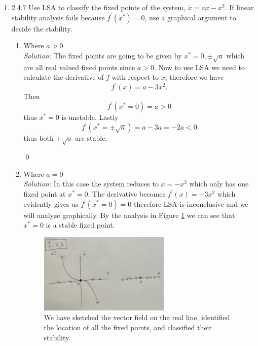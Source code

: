 \documentclass[10pt]{amsart}
\theoremstyle{nonumberplain}
\begin{document}
\begin{enumerate}[label={\bf {\arabic*}:}]
\begin{enumerate}
\end{enumerate}

\newpage

\item 2.4.7 Use LSA to classify the fixed points of the system, $\dot x = ax - x^3$. If linear stability analysis fails because $f^\prime (x^*) = 0$, use a graphical argument to decide the stability. \\


\begin{enumerate}

\item Where $a > 0$ \\

\noindent
\textit{Solution:} The fixed points are going to be given by $x^* = 0, \pm \sqrt{a}$ which are all real valued fixed points since $a > 0$.
Now to use LSA we need to calculate the derivative of $f$ with respect to $x$, therefore we have
$$
f^\prime (x) = a - 3x^2.
$$
Then 
$$f^\prime (x^* = 0) = a > 0$$
thus $x^* = 0$ is unstable.
Lastly
$$f^\prime (x^* = \pm \sqrt a) = a - 3a = -2a < 0$$
thus both $\pm \sqrt a $ are stable.

\qed \\

\item Where $a = 0$ \\

\noindent
\textit{Solution:} In this case the system reduces to $\dot x = -x^3$ which only has one fixed point at $x^* = 0$. 
The derivative becomes $f^\prime(x) = -3x^2$ which evidently gives us $f^\prime(x^*= 0) = 0$ therefore LSA is inconclusive and we will analyze graphically.
By the analysis in Figure \ref{fig:f6} we can see that $x^* = 0$ is a stable fixed point.

\begin{figure}[h]
	\centering
	\includegraphics[height=1.5in]{2_4_7.png}
 	\caption{We have sketched the vector field on the real line, identified the location of all the fixed points, and classified their stability.}\label{fig:f6}
\end{figure}


\end{enumerate}
\end{enumerate}
\end{document}
